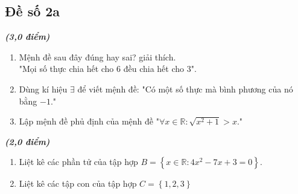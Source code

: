 \subsection{Đề số 2a}
\setcounter{bt}{0}
\begin{bt} %
	\textit{\textbf{(3,0 điểm)}} 	
	\begin{enumerate} 
		\item Mệnh đề sau đây đúng hay sai? giải thích. \\
		"Mọi số thực chia hết cho $ 6 $ đều chia hết cho $ 3 $".
		\item Dùng kí hiệu $ \exists $ để viết mệnh đề:
		"Có một số thực mà bình phương của nó bằng $ -1. $"
		\item Lập mệnh đề phủ định của mệnh đề $ \text{"} \forall x \in \mathbb{R} : \sqrt{x^2+1} > x. \text{"}  $		
	\end{enumerate}
	
\end{bt}
\begin{bt} %
	\textit{\textbf{(2,0 điểm)}} 		
	\begin{enumerate}
		\item Liệt kê các phần tử của tập hợp $ B = \left\{x \in \mathbb{R}: 4x^2 - 7x + 3 = 0 \right\}. $
		\item Liệt kê các tập con của tập hợp $ C = \left\{ {1,2,3} \right\} $
	\end{enumerate}
\end{bt}


